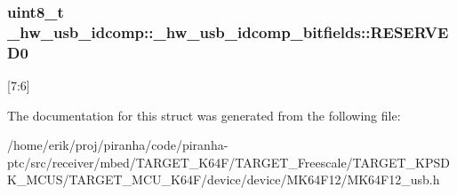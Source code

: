 \subsubsection[{\texorpdfstring{R\+E\+S\+E\+R\+V\+E\+D0}{RESERVED0}}]{\setlength{\rightskip}{0pt plus 5cm}uint8\+\_\+t \+\_\+hw\+\_\+usb\+\_\+idcomp\+::\+\_\+hw\+\_\+usb\+\_\+idcomp\+\_\+bitfields\+::\+R\+E\+S\+E\+R\+V\+E\+D0}\hypertarget{struct__hw__usb__idcomp_1_1__hw__usb__idcomp__bitfields_abb7d7106fcc3c840ae2e94486b598d35}{}\label{struct__hw__usb__idcomp_1_1__hw__usb__idcomp__bitfields_abb7d7106fcc3c840ae2e94486b598d35}
\mbox{[}7\+:6\mbox{]} 

The documentation for this struct was generated from the following file\+:\begin{DoxyCompactItemize}
\item 
/home/erik/proj/piranha/code/piranha-\/ptc/src/receiver/mbed/\+T\+A\+R\+G\+E\+T\+\_\+\+K64\+F/\+T\+A\+R\+G\+E\+T\+\_\+\+Freescale/\+T\+A\+R\+G\+E\+T\+\_\+\+K\+P\+S\+D\+K\+\_\+\+M\+C\+U\+S/\+T\+A\+R\+G\+E\+T\+\_\+\+M\+C\+U\+\_\+\+K64\+F/device/device/\+M\+K64\+F12/M\+K64\+F12\+\_\+usb.\+h\end{DoxyCompactItemize}

